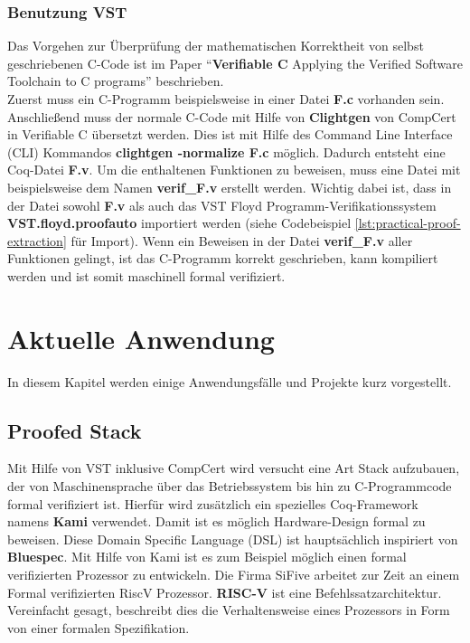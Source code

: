 \subsubsection{Benutzung VST}
Das Vorgehen zur Überprüfung der mathematischen Korrektheit von selbst geschriebenen C-Code ist im Paper "`\textbf{Verifiable C} Applying the Verified Software Toolchain to C programs"' beschrieben.\cite{Appel01:VST}\\
Zuerst muss ein C-Programm beispielsweise in einer Datei \textbf{F.c} vorhanden sein. Anschließend muss der normale C-Code mit Hilfe von \textbf{Clightgen} von CompCert in Verifiable C übersetzt werden. Dies ist mit Hilfe des Command Line Interface (CLI) Kommandos \textbf{clightgen -normalize F.c} möglich. Dadurch entsteht eine Coq-Datei \textbf{F.v}. Um die enthaltenen Funktionen zu beweisen, muss eine Datei mit beispielsweise dem Namen \textbf{verif\_F.v} erstellt werden. Wichtig dabei ist, dass in der Datei sowohl \textbf{F.v} als auch das VST Floyd Programm-Verifikationssystem \textbf{VST.floyd.proofauto} importiert werden (siehe Codebeispiel \ref{lst:practical-proof-extraction} für Import). Wenn ein Beweisen in der Datei \textbf{verif\_F.v} aller Funktionen gelingt, ist das C-Programm korrekt geschrieben, kann kompiliert werden und ist somit maschinell formal verifiziert.


\section{Aktuelle Anwendung}
\label{s:current-usage}
In diesem Kapitel werden einige Anwendungsfälle und Projekte kurz vorgestellt.

\subsection{Proofed Stack}
Mit Hilfe von VST inklusive CompCert wird versucht eine Art Stack aufzubauen, der von Maschinensprache über das Betriebssystem bis hin zu C-Programmcode formal verifiziert ist. Hierfür wird zusätzlich ein spezielles Coq-Framework namens \textbf{Kami} verwendet. Damit ist es möglich Hardware-Design formal zu beweisen. Diese Domain Specific Language (DSL) ist hauptsächlich inspiriert von \textbf{Bluespec}. Mit Hilfe von Kami ist es zum Beispiel möglich einen formal verifizierten Prozessor zu entwickeln. Die Firma SiFive arbeitet zur Zeit an einem Formal verifizierten RiscV Prozessor. \textbf{RISC-V} ist eine Befehlssatzarchitektur.\cite{KAMI01:ST} Vereinfacht gesagt, beschreibt dies die Verhaltensweise eines Prozessors in Form von einer formalen Spezifikation.\\

